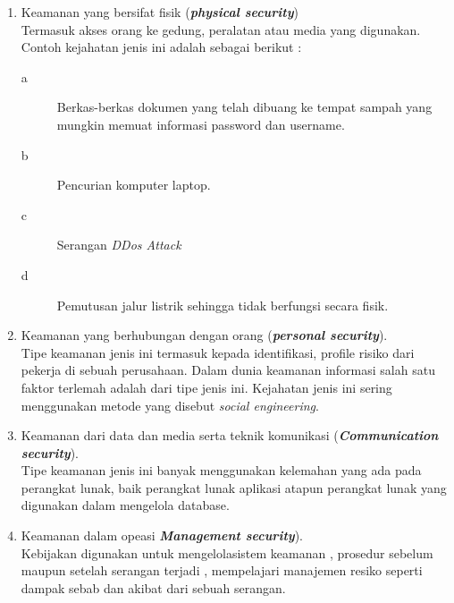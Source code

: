 \begin{enumerate}
\item
Keamanan yang bersifat fisik (\textbf{\emph{physical security}})
\\Termasuk akses orang ke gedung, peralatan atau media yang digunakan. Contoh kejahatan jenis ini adalah sebagai berikut :
\begin{description}
\item[a] Berkas-berkas dokumen yang telah dibuang ke tempat sampah yang mungkin memuat informasi password dan username.
\item[b] Pencurian komputer laptop.
\item[c] Serangan \textit {DDos Attack}
\item[d] Pemutusan jalur listrik sehingga tidak berfungsi secara fisik.
\end{description}
\item
Keamanan yang berhubungan dengan orang (\textbf{\emph{personal security}}). 
\\ Tipe keamanan jenis ini termasuk kepada identifikasi, profile risiko dari pekerja di sebuah perusahaan. Dalam dunia keamanan informasi salah satu faktor terlemah adalah dari tipe jenis ini. Kejahatan jenis ini sering menggunakan metode yang disebut \textit {social engineering}.
\item
Keamanan dari data dan media serta teknik komunikasi (\textbf{\emph{Communication security}}).
\\ Tipe keamanan jenis ini banyak menggunakan kelemahan yang ada pada perangkat lunak, baik perangkat lunak aplikasi atapun perangkat lunak yang digunakan dalam mengelola database.
\item
Keamanan dalam opeasi  \textbf{\emph{Management security}}).
\\Kebijakan digunakan untuk mengelolasistem keamanan , prosedur sebelum maupun setelah serangan terjadi , mempelajari manajemen resiko seperti dampak sebab dan akibat dari sebuah serangan.

\end{enumerate}


